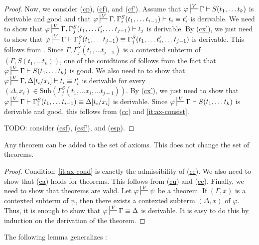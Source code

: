 \documentclass[reqno]{amsart}
\newcommand{\axref}[1]{(\hyperref[ax:#1]{#1})}
\theoremstyle{definition}
\theoremstyle{remark}
\newcommand{\fs}[1]{\mathrm{#1}}
\newcommand{\sub}{\fs{Sub}}
\numberwithin{figure}{section}
\begin{document}
\begin{proof}
Now, we consider \axref{cp}, \axref{cf}, and \axref{cf'}.
Assume that $\varphi \sststile{}{V} \Gamma \vdash S(t_1, \ldots t_k)$ is derivable and good and that $\varphi \sststile{}{V} \Gamma, \Gamma_i^S(t_1, \ldots t_{i-1}) \vdash t_i \equiv t_i'$ is derivable.
We need to show that $\varphi \sststile{}{V} \Gamma, \Gamma_j^S(t_1, \ldots t_i', \ldots t_{j-1}) \vdash t_j$ is derivable.
By \axref{cx'}, we just need to show that $\varphi \sststile{}{V} \Gamma \vdash \Gamma_j^S(t_1, \ldots t_{j-1}) \equiv \Gamma_j^S(t_1, \ldots t_i', \ldots t_{j-1})$ is derivable.
This follows from .
Since $\Gamma, \Gamma_j^S(t_1, \ldots t_{j-1})$ is a contexted subterm of $(\Gamma, S(t_1, \ldots t_k))$, one of the conidtions of  follows from the fact that $\varphi \sststile{}{V} \Gamma \vdash S(t_1, \ldots t_k)$ is good.
We also need to to show that $\varphi \sststile{}{V} \Gamma, \Delta[t_i/x_i] \vdash t_i \equiv t_i'$ is derivable for every $(\Delta,x_i) \in \sub(\Gamma_j^S(t_1, \ldots x_i, \ldots t_{j-1}))$.
By \axref{cx'}, we just need to show that $\varphi \sststile{}{V} \Gamma \vdash \Gamma_i^S(t_1, \ldots t_{i-1}) \equiv \Delta[t_i/x_i]$ is derivable.
Since $\varphi \sststile{}{V} \Gamma \vdash S(t_1, \ldots t_k)$ is derivable and good, this follows from \axref{cc} and \eqref{it:ax-consist}.

TODO: consider \axref{esf}, \axref{esf'}, and \axref{esp}.
\end{proof}

\begin{cor}
Any theorem can be added to the set of axioms.
This does not change the set of theorems.
\end{cor}
\begin{proof}
Condition~\eqref{it:ax-cond} is exactly the admissibility of \axref{ce}.
We also need to show that \axref{ca} holds for theorems.
This follows from \axref{cu} and \axref{cc}.
Finally, we need to show that theorems are valid.
Let $\varphi \sststile{}{V} \psi$ be a theorem.
If $(\Gamma,x)$ is a contexted subterm of $\psi$, then there exists a contexted subterm $(\Delta,x)$ of $\varphi$.
Thus, it is enough to show that $\varphi \sststile{}{V} \Gamma \equiv \Delta$ is derivable.
It is easy to do this by induction on the derivation of the theorem.
\end{proof}

The following lemma generalizes :
\end{document}
